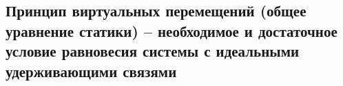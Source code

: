 

\subsection{Принцип виртуальных перемещений (общее уравнение статики) -- необходимое и достаточное условие равновесия системы с идеальными удерживающими связями}



